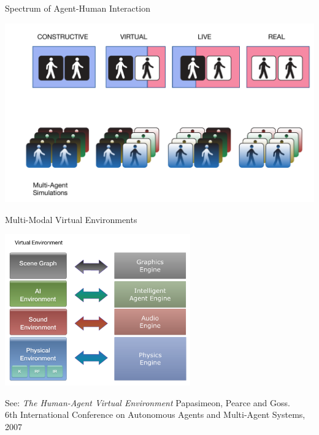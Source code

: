 \documentclass[xcolor=dvipsnames,t]{beamer}
\begin{document}
\begin{frame}{Spectrum of Agent-Human Interaction} 
    \begin{center}
        \includegraphics[width=\textwidth]{spectrum} 
    \end{center} 
\end{frame} 

\begin{frame}{Multi-Modal Virtual Environments} 
    \begin{center}
        \includegraphics[width=8cm]{multi-modal} 
    \end{center} 
    \tiny See: \emph{The Human-Agent Virtual Environment} Papasimeon, Pearce and Goss. \\
    6th International Conference on Autonomous Agents and Multi-Agent Systems, 2007 
    \normalsize
\end{frame} 
\end{document}
